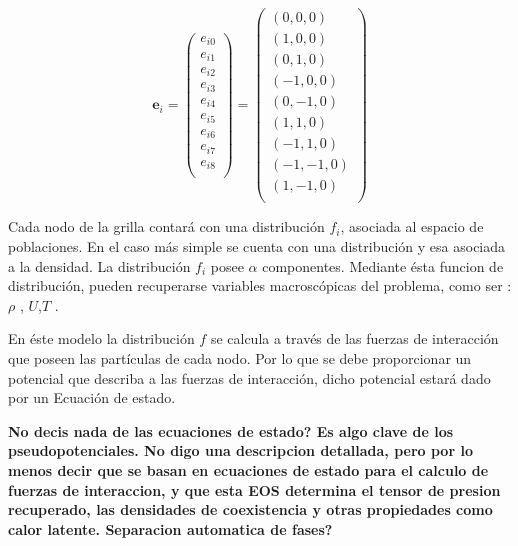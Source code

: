 \begin{equation}
    {\mathbf{e}}_{i} =  
    \left( \begin{array}{c} 
                e_{i0} \\ e_{i1}\\ e_{i2}\\ e_{i3}\\ e_{i4}\\ e_{i5}\\
                e_{i6}\\ e_{i7}\\ e_{i8}\\
            \end{array}
    \right) =
    \left( \begin{array}{c} 
        (0,0,0) \\ (1,0,0) \\ (0,1,0) \\(-1,0,0) \\ (0,-1,0) \\ (1,1,0) \\
        (-1,1,0) \\ (-1,-1,0) \\ (1,-1,0)\\ 
    \end{array}
    \right) 
    \label{eq:velgrilla}
\end{equation}

Cada nodo de la grilla contará con una distribución $f_{i}$, asociada al espacio de poblaciones. En el caso más simple se cuenta con una distribución y esa asociada a la densidad. La distribución $f_{i}$ posee $\alpha$ componentes. Mediante ésta funcion de distribución, pueden recuperarse variables macroscópicas del problema, como ser : $\rho$ , $U$,$T$ .

En éste modelo la distribución $f$ se calcula a través de las fuerzas de interacción que poseen las partículas de cada nodo. Por lo que se debe proporcionar un potencial que describa a las fuerzas de interacción, dicho potencial estará dado por un Ecuación de estado.



\textbf{No decis nada de las ecuaciones de estado? Es algo clave de los pseudopotenciales. No digo una descripcion detallada, pero por lo menos decir que se basan en ecuaciones de estado para el calculo de fuerzas de interaccion, y que esta EOS determina el tensor de presion recuperado, las densidades de coexistencia y otras propiedades como calor latente. 
Separacion automatica de fases?}

